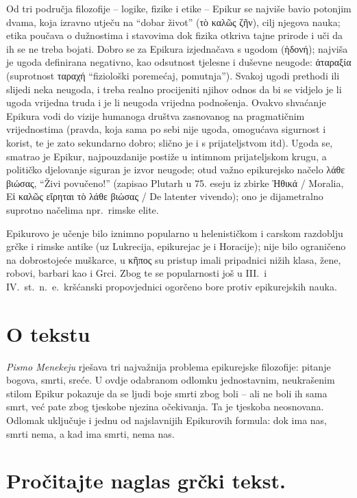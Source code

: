 Od tri područja filozofije – logike, fizike i etike – Epikur se najviše bavio potonjim dvama, koja izravno utječu na ``dobar život'' \textgreek{(τὸ καλῶς ζῆν),} cilj njegova nauka; etika poučava o dužnostima i stavovima dok fizika otkriva tajne prirode i uči da ih se ne treba bojati. Dobro se za Epikura izjednačava s ugodom \textgreek{(ἡδονή)}; najviša je ugoda definirana negativno, kao odsutnost tjelesne i duševne neugode: \textgreek{ἀταραξία} (suprotnost ταραχή ``fiziološki poremećaj, pomutnja''). Svakoj ugodi prethodi ili slijedi neka neugoda, i treba realno procijeniti njihov odnos da bi se vidjelo je li ugoda vrijedna truda i je li neugoda vrijedna podnošenja. Ovakvo shvaćanje Epikura vodi do vizije humanoga društva zasnovanog na pragmatičnim vrijednostima (pravda, koja sama po sebi nije ugoda, omogućava sigurnost i korist, te je zato sekundarno dobro; slično je i s prijateljstvom itd). Ugoda se, smatrao je Epikur, najpouzdanije postiže u intimnom prijateljskom krugu, a političko djelovanje siguran je izvor neugode; otud važno epikurejsko načelo \textgreek{λάθε βιώσας}, ``Živi povučeno!'' (zapisao Plutarh u 75. eseju iz zbirke Ἠθικά / Moralia, Εἰ καλῶς εἴρηται τὸ λάθε βιώσας / De latenter vivendo); ono je dijametralno suprotno načelima npr.\ rimske elite.

Epikurovo je učenje bilo iznimno popularno u helenističkom i carskom razdoblju grčke i rimske antike (uz Lukrecija, epikurejac je i Horacije); nije bilo ograničeno na dobrostojeće muškarce, u \textgreek{κῆπος} su pristup imali pripadnici nižih klasa, žene, robovi, barbari kao i Grci. Zbog te se popularnosti još u III.\ i IV.~st.\ n.~e.\ kršćanski propovjednici ogorčeno bore protiv epikurejskih nauka.

\section*{O tekstu}

\textit{Pismo Menekeju} rješava tri najvažnija problema epikurejske filozofije: pitanje bogova, smrti, sreće. U ovdje odabranom odlomku jednostavnim, neukrašenim stilom Epikur pokazuje da se ljudi boje smrti zbog boli – ali ne boli ih sama smrt, već pate zbog tjeskobe njezina očekivanja. Ta je tjeskoba neosnovana. Odlomak uključuje i jednu od najslavnijih Epikurovih formula: dok ima nas, smrti nema, a kad ima smrti, nema nas.


\section*{Pročitajte naglas grčki tekst.}

